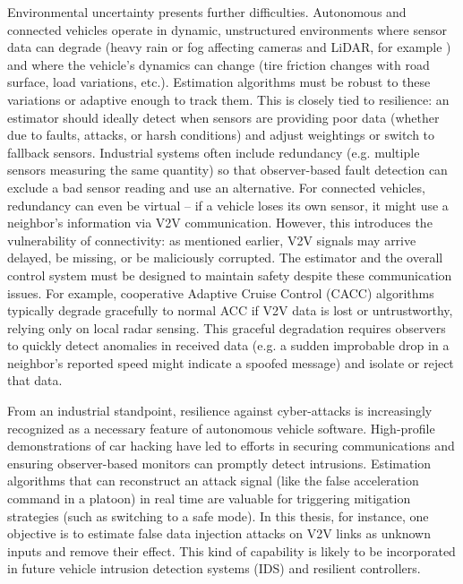 Environmental uncertainty presents further difficulties. Autonomous and connected vehicles operate in dynamic, unstructured environments where sensor data can degrade (heavy rain or fog affecting cameras and LiDAR, for example \cite{zhangPerceptionSensingAutonomous2023}) and where the vehicle’s dynamics can change (tire friction changes with road surface, load variations, etc.). Estimation algorithms must be robust to these variations or adaptive enough to track them. This is closely tied to resilience: an estimator should ideally detect when sensors are providing poor data (whether due to faults, attacks, or harsh conditions) and adjust weightings or switch to fallback sensors. Industrial systems often include redundancy (e.g. multiple sensors measuring the same quantity) so that observer-based fault detection can exclude a bad sensor reading and use an alternative. For connected vehicles, redundancy can even be virtual – if a vehicle loses its own sensor, it might use a neighbor’s information via V2V communication. However, this introduces the vulnerability of connectivity: as mentioned earlier, V2V signals may arrive delayed, be missing, or be maliciously corrupted. The estimator and the overall control system must be designed to maintain safety despite these communication issues. For example, cooperative Adaptive Cruise Control (CACC) algorithms typically degrade gracefully to normal ACC if V2V data is lost or untrustworthy, relying only on local radar sensing. This graceful degradation requires observers to quickly detect anomalies in received data (e.g. a sudden improbable drop in a neighbor’s reported speed might indicate a spoofed message) and isolate or reject that data.

From an industrial standpoint, resilience against cyber-attacks is increasingly recognized as a necessary feature of autonomous vehicle software. High-profile demonstrations of car hacking have led to efforts in securing communications and ensuring observer-based monitors can promptly detect intrusions. Estimation algorithms that can reconstruct an attack signal (like the false acceleration command in a platoon) in real time are valuable for triggering mitigation strategies (such as switching to a safe mode). In this thesis, for instance, one objective is to estimate false data injection attacks on V2V links as unknown inputs and remove their effect. This kind of capability is likely to be incorporated in future vehicle intrusion detection systems (IDS) and resilient controllers.

